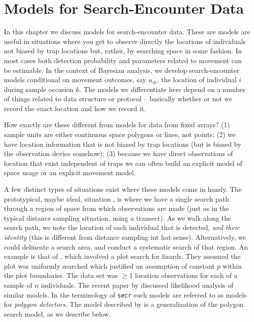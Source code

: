 \chapter{Models for  Search-Encounter Data}
\label{chapt.search-encounter}

\vspace{0.3cm}


In this chapter we discuss models for search-encounter data. These are
models are useful in situations where you get to observe directly the
locations of individuals not biased by trap locations but, rather, by
searching space in some fashion. In most cases both detection
probability and parameters related to movement can be estimable. In
the context of Bayesian analysis, we develop search-encounter models
conditional on movement outcomes, say $u_{ik}$, the location of
individual $i$ during sample occasion $k$.  The models we
differentiate here depend on a number of things related to data
structure or protocol -- basically whether or not we record the exact
location and how we record it.

How exactly are these different from models for data from fixed
arrays?  (1) sample units are either continuous space polygons or
lines, not points; (2) we have location information that is not biased
by trap locations (but is biased by the observation device somehow);
(3) because we have direct observations of location that exist
independent of traps we can often build an explicit model of space
usage or an explicit movement model.

A few distinct types of situations exist where these models come in
handy. The prototypical, maybe ideal, situation \citet{royle_etal:2011mee}, is where we have a
single search path through a region of space from which observations are made
(just as in the typical distance sampling situation, using a
transect). As we walk along the search path, 
 we note the location of each individual that is detected, 
{\it and their identity} (this is different from distance
sampling int hat sense). Alternatively, we could delineate a search
area, and conduct a systematic search of that region.
An example is that of \citet{royle_young:2008}, which 
involved a plot search for lizards. They assumed the plot was
uniformly searched which justified an assumption of constant $p$
within the plot boundaries. The data set was $\ge 1$ location
observations for each of a sample of $n$ individuals.  The recent
paper by \citet{efford:2011} discussed likelihood analysis of similar
models. In the terminology 
of \mbox{\tt secr} such models are referred to
as models for {\it polygon detectors}.  The model 
described by \citep{royle_etal:2011mee} is a generalization of the
polygon search model, as we describe below.


